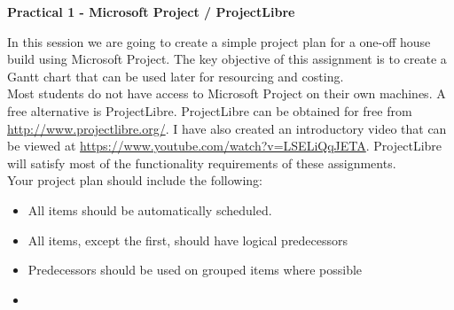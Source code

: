 

\begin{flushleft}
\Large\textbf{Practical 1 - Microsoft Project / ProjectLibre}\\
\end{flushleft}


In this session we are going to create a simple project plan for a one-off house build using Microsoft Project.  The key objective of this assignment is to create a Gantt chart that can be used later for resourcing and costing.\\

Most students do not have access to Microsoft Project on their own machines.  A free alternative is ProjectLibre.  ProjectLibre can be obtained for free from \href{http://www.projectlibre.org/}{http://www.projectlibre.org/}.  I have also created an introductory video that can be viewed at \href{https://www.youtube.com/watch?v=LSELiQqJETA}{https://www.youtube.com/watch?v=LSELiQqJETA}.  ProjectLibre will satisfy most of the functionality requirements of these assignments.\\

Your project plan should include the following:

\begin{itemize}
	\item All items should be automatically scheduled.
	\item All items, except the first, should have logical predecessors
	\item Predecessors should be used on grouped items where possible
	\item 
\end{itemize}








